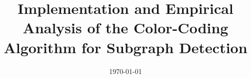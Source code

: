 
% 

% 


\documentclass{article}
\usepackage{amsmath, amssymb, graphicx, hyperref, cite, fancyhdr, geometry}
\geometry{a4paper, margin=1in}

\title{Implementation and Empirical Analysis of the Color-Coding Algorithm for Subgraph Detection}
\author{}
\date{\today}

\pagestyle{fancy}
\fancyhf{}
\fancyfoot[C]{\thepage}



